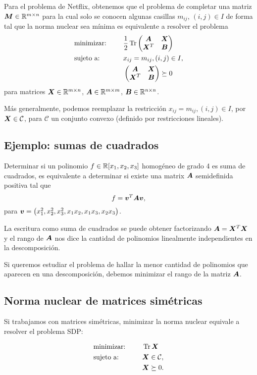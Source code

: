 Para el problema de Netflix, obtenemos que el problema de completar una matriz $\bm{M} \in \mathbb{R}^{m \times n}$ para la cual solo se conocen algunas casillas $m_{ij}$, $(i,j) \in I$ de forma tal que la norma nuclear sea mínima es equivalente a resolver el problema
\begin{alignat*}{2}
  & \text{minimizar: } & & \frac{1}{2}\operatorname{Tr} \begin{pmatrix} \bm{A} & \bm{X} \\ \bm{X}^T & \bm{B} \end{pmatrix} \\
   & \text{sujeto a: } & \quad & x_{ij} = m_{ij}, (i, j) \in I, \\
   &&& \begin{pmatrix} \bm{A} & \bm{X} \\ \bm{X}^T & \bm{B} \end{pmatrix}   \succeq 0
\end{alignat*}
para matrices $\bm{X} \in \mathbb{R}^{m \times n}$, $\bm{A} \in \mathbb{R}^{m \times m}$, $\bm{B} \in \mathbb{R}^{n \times n}$.

Más generalmente, podemos reemplazar la restricción $x_{ij} = m_{ij}, (i, j) \in I$, por $\bm{X}  \in \mathcal{C}$, para $\mathcal{C}$ un conjunto convexo (definido por restricciones lineales).

\subsection{Ejemplo: sumas de cuadrados}

Determinar si un polinomio $f \in \mathbb{R}[x_1, x_2, x_3]$ homogéneo de grado 4 es suma de cuadrados, es equivalente a determinar si existe una matrix $\bm{A}$ semidefinida positiva tal que
$$
f = \bm{v}^T  \bm{A} \bm{v},
$$
para $\bm{v} = \begin{pmatrix} x_1^2, x_2^2, x_3^2, x_1 x_2, x_1 x_3, x_2 x_3 \end{pmatrix}$.

La escritura como suma de cuadrados se puede obtener factorizando $\bm{A} = \bm{X}^T \bm{X}$ y el rango de $\bm{A}$ nos dice la cantidad de polinomios linealmente independientes en la descomposición.

Si queremos estudiar el problema de hallar la menor cantidad de polinomios que aparecen en una descomposición, debemos minimizar el rango de la matriz $\bm{A}$.


\subsection{Norma nuclear de matrices simétricas}

Si trabajamos con matrices simétricas, minimizar la norma nuclear equivale a resolver el problema SDP:

\begin{alignat*}{2}
  & \text{minimizar: } & & \operatorname{Tr} \bm{X} \\
   & \text{sujeto a: } & \quad & \bm{X}  \in \mathcal{C}, \\
   &&& \bm{X} \succeq 0.
\end{alignat*}

